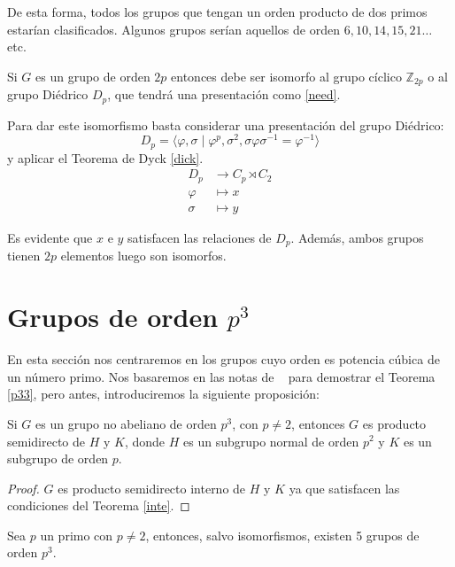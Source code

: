 De esta forma, todos los grupos que tengan un orden producto de dos primos estarían clasificados. Algunos grupos serían aquellos de orden $6, 10, 14, 15, 21 \ldots$ etc.

\newpage
\begin{remark} \label{2p}
Si $G$ es un grupo de orden $2p$ entonces debe ser isomorfo al grupo cíclico $\mathbb{Z}_{2p}$ o al grupo Diédrico $D_p$, que tendrá una presentación como \eqref{need}. %

Para dar este isomorfismo basta considerar una presentación del grupo Diédrico:
\[
D_p = \langle \varphi , \sigma \mid \varphi^p, \sigma^2, \sigma\varphi\sigma^{-1}=\varphi^{-1}  \rangle 
\]
y aplicar el Teorema de Dyck \ref{dick}.
\begin{align*}
     D_p &\rightarrow C_p \rtimes C_2 \\
    \varphi & \mapsto x \\
    \sigma & \mapsto y
\end{align*}
\end{remark}
Es evidente que $x$ e $y$ satisfacen las relaciones de $D_p$. Además, ambos grupos tienen $2p$ elementos luego son isomorfos.






\section{Grupos de orden $p^3$} \label{p3}


En esta sección nos centraremos en los grupos cuyo orden es potencia cúbica de un número primo. Nos basaremos en las notas de ~\cite{abstractrojo} para demostrar el Teorema \ref{p33}, pero antes,  introduciremos la siguiente proposición:


\begin{proposition} \label{corp}
Si $G$ es un grupo no abeliano de orden $p^3$, con $p\not = 2$, entonces $G$ es producto semidirecto de $H$ y $K$, donde $H$ es un subgrupo normal de orden $p^2$ y $K$ es un subgrupo de orden $p$.
\end{proposition}

\begin{proof}
$G$ es producto semidirecto interno de $H$ y $K$ ya que satisfacen las condiciones del Teorema \ref{inte}.
\end{proof}

\begin{theorem} \label{p33}
Sea $p$ un primo con $p\not = 2$, entonces, salvo isomorfismos, existen 5 grupos de orden $p^3$.
\end{theorem}

